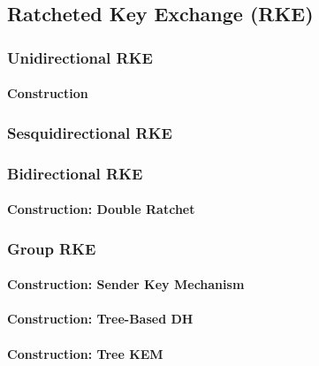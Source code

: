 \documentclass[a4paper,orivec]{llncs}
\begin{document}
\subsection{Ratcheted Key Exchange (RKE)}

\subsubsection{Unidirectional RKE}

\paragraph{Construction}

\subsubsection{Sesquidirectional RKE}

\subsubsection{Bidirectional RKE}

\paragraph{Construction: Double Ratchet}

\subsubsection{Group RKE}

\paragraph{Construction: Sender Key Mechanism}

\paragraph{Construction: Tree-Based DH}

\paragraph{Construction: Tree KEM}


\end{document}
